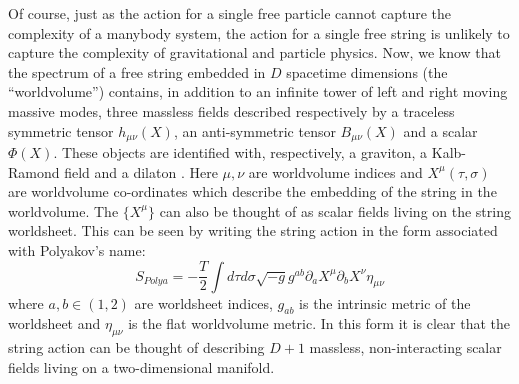 \documentclass{ws-mpla}
\begin{document}
Of course, just as the action for a single free particle cannot capture the complexity of a manybody system, the action for a single free string is unlikely to capture the complexity of gravitational and particle physics. Now, we know that the spectrum of a free string embedded in $ D $ spacetime dimensions (the ``worldvolume'') contains, in addition to an infinite tower of left and right moving massive modes, three massless fields described respectively by a traceless symmetric tensor $ h_{\mu\nu}(X) $, an anti-symmetric tensor $ B_{\mu\nu}(X) $ and a scalar $ \Phi(X) $. These objects are identified with, respectively, a graviton, a Kalb-Ramond field and a dilaton \cite[Sec 2.3.2]{Tong2010Lectures}. Here $ \mu, \nu $ are worldvolume indices and $ X^{\mu}(\tau,\sigma) $ are worldvolume co-ordinates which describe the embedding of the string in the worldvolume. The $ \{X^\mu\} $ can also be thought of as scalar fields living on the string worldsheet. This can be seen by writing the string action in the form associated with Polyakov's name:
\begin{equation}\label{eqn:polyakov-flat}
	S_{Polya} = -\frac{T}{2} \int d\tau d\sigma \sqrt{-g} g^{ab} \partial_a X^\mu \partial_b X^\nu \eta_{\mu\nu}
\end{equation}
where $ a,b \in (1,2) $ are worldsheet indices, $ g_{ab} $ is the intrinsic metric of the worldsheet and $ \eta_{\mu\nu} $ is the flat worldvolume metric. In this form it is clear that the string action can be thought of describing $ D+1 $ massless, non-interacting scalar fields living on a two-dimensional manifold.
\end{document}
